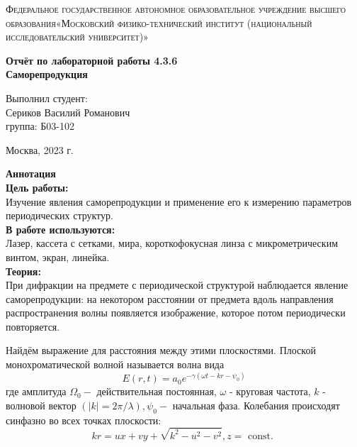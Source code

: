\documentclass[a4paper, 12pt]{article}%
\begin{document}
	\begin{titlepage}
		\begin{center}
			\textsc{Федеральное государственное автономное образовательное учреждение высшего образования«Московский физико-технический институт (национальный исследовательский университет)»\\[5mm]
			}
			
			\vfill
			
			\textbf{Отчёт по лабораторной работы 4.3.6\\[3mm]
				Саморепродукция
				\\[50mm]
			}
			
		\end{center}
		
		\hfill
		\begin{minipage}{.5\textwidth}
			Выполнил студент:\\[2mm]
			Сериков Василий Романович\\[2mm]
			группа: Б03-102\\[5mm]
			
		\end{minipage}
		\vfill
		\begin{center}
			Москва, 2023 г.
		\end{center}
		
	\end{titlepage}
	
	\newpage
	\setcounter{page}{2}
	\textbf{Аннотация}\\
	
	\textbf{Цель работы: }\\
	
	Изучение явления саморепродукции и применение его к измерению параметров периодических структур.\\
	
	\textbf{В работе используются: } \\
	
	Лазер, кассета с сетками, мира, короткофокусная линза с микрометрическим винтом, экран, линейка.\\
	
	\textbf{Теория: }\\
	
	При дифракции на предмете с периодической структурой наблюдается явление саморепродукции: на некотором расстоянии от предмета вдоль направления распространения волны появляется изображение, которое потом периодически повторяется.  \par
	
	Найдём выражение для расстояния между этими плоскостями. Плоской монохроматической волной называется волна вида
	$$
	E(r, t)=a_0 e^{-\gamma\left(\omega t-k r-\psi_0\right)}
	$$
	где амплитуда $\Omega_0-$ действительная постоянная, $\omega$ - круговая частота, $k$ - волновой вектор $(|k|=2 \pi / \lambda), \psi_0-$ начальная фаза. Колебания происходят синфазно во всех точках плоскости:
	$$
	k r=u x+v y+\sqrt{k^2-u^2-v^2}, z=\text { const. }
	$$
	
\end{document}
